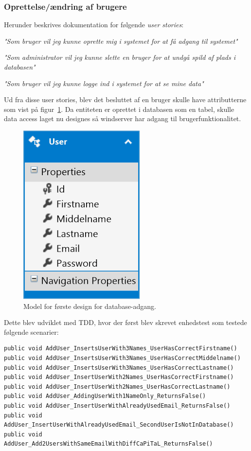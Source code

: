\subsubsection{Oprettelse/ændring af brugere}
Herunder beskrives dokumentation for følgende \textit{user stories}:

\textit{"Som bruger vil jeg kunne oprette mig i systemet for at få adgang til systemet"}

\textit{"Som administrator vil jeg kunne slette en bruger for at undgå spild af plads i databasen"}

\textit{"Som bruger vil jeg kunne logge ind i systemet for at se mine data"}

Ud fra disse user stories, blev det besluttet af en bruger skulle have attributterne som vist på figur~\ref{fig:database_model_1}. Da entiteten er oprettet i databasen som en tabel, skulle data access laget nu designes så \gls{windserver} har adgang til brugerfunktionalitet.


\begin{figure}[H]
	\centering
	\includegraphics[width=0.25\linewidth]{figs/design/database_model_1}
	\caption{Model for første design for database-adgang.}
	\label{fig:database_model_1}
\end{figure}

Dette blev udviklet med TDD, hvor der først blev skrevet enhedstest som testede følgende scenarier: 

\begin{lstlisting}[caption=Testcases til \textit{AddUser} metoden.,label=code:addusertestcases]
public void AddUser_InsertsUserWith3Names_UserHasCorrectFirstname()
public void AddUser_InsertsUserWith3Names_UserHasCorrectMiddelname()
public void AddUser_InsertsUserWith3Names_UserHasCorrectLastname()
public void AddUser_InsertUserWith2Names_UserHasCorrectFirstname()
public void AddUser_InsertUserWith2Names_UserHasCorrectLastname()
public void AddUser_AddingUserWith1NameOnly_ReturnsFalse()
public void AddUser_InsertUserWithAlreadyUsedEmail_ReturnsFalse()
public void AddUser_InsertUserWithAlreadyUsedEmail_SecondUserIsNotInDatabase()
public void AddUser_Add2UsersWithSameEmailWithDiffCaPiTaL_ReturnsFalse()
\end{lstlisting}

